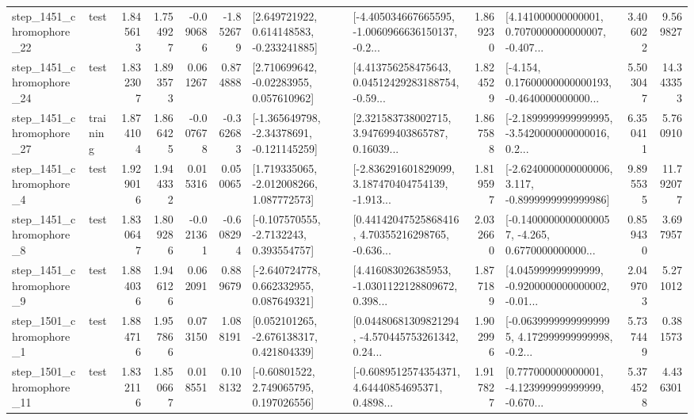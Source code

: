 \begin{tabular}{llrrrrllrlrr}
 step\_1451\_chromophore\_22 &      test &      1.845613 &    1.754927 &     -0.090686 & -1.852679 &    [2.649721922, 0.614148583, -0.233241885] &  [-4.405034667665595, -1.0060966636150137, -0.2... &       1.869230 &  [4.141000000000001, 0.7070000000000007, -0.407... &            3.406022 &          9.569827 \\
 step\_1451\_chromophore\_24 &      test &      1.832307 &    1.893573 &      0.061267 &  0.874888 &     [2.710699642, -0.02283955, 0.057610962] &  [4.413756258475643, 0.04512429283188754, -0.59... &       1.824529 &  [-4.154, 0.17600000000000193, -0.4640000000000... &            5.503047 &         14.343353 \\
 step\_1451\_chromophore\_27 &  training &      1.874104 &    1.866425 &     -0.007678 & -0.362683 &   [-1.365649798, -2.34378691, -0.121145259] &  [2.321583738002715, 3.947699403865787, 0.16039... &       1.867588 &  [-2.1899999999999995, -3.5420000000000016, 0.2... &            6.350411 &          5.760910 \\
  step\_1451\_chromophore\_4 &      test &      1.929016 &    1.944332 &      0.015316 &  0.050065 &    [1.719335065, -2.012008266, 1.087772573] &  [-2.836291601829099, 3.187470404754139, -1.913... &       1.819597 &  [-2.6240000000000006, 3.117, -0.8999999999999986] &            9.895535 &         11.792077 \\
  step\_1451\_chromophore\_8 &      test &      1.830647 &    1.809286 &     -0.021361 & -0.608294 &     [-0.107570555, -2.7132243, 0.393554757] &  [0.44142047525868416, 4.70355216298765, -0.636... &       2.032660 &  [-0.14000000000000057, -4.265, 0.6770000000000... &            0.859430 &          3.697957 \\
  step\_1451\_chromophore\_9 &      test &      1.884036 &    1.946126 &      0.062091 &  0.889679 &    [-2.640724778, 0.662332955, 0.087649321] &  [4.416083026385953, -1.0301122128809672, 0.398... &       1.877189 &  [4.045999999999999, -0.9200000000000002, -0.01... &            2.049703 &          5.271012 \\
  step\_1501\_chromophore\_1 &      test &      1.884716 &    1.957866 &      0.073150 &  1.088191 &    [0.052101265, -2.676138317, 0.421804339] &  [0.04480681309821294, -4.570445753261342, 0.24... &       1.902996 &  [-0.06399999999999995, 4.172999999999998, -0.2... &            5.737449 &          0.381573 \\
 step\_1501\_chromophore\_11 &      test &      1.832116 &    1.850667 &      0.018551 &  0.108132 &     [-0.60801522, 2.749065795, 0.197026556] &  [-0.6089512574354371, 4.64440854695371, 0.4898... &       1.917827 &  [0.777000000000001, -4.123999999999999, -0.670... &            5.374528 &          4.436301 \\

\end{tabular}
